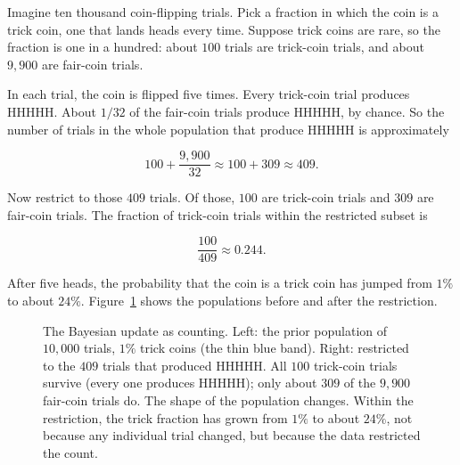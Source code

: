 Imagine ten thousand coin-flipping trials. Pick a fraction in which the coin is a trick coin, one that lands heads every time. Suppose trick coins are rare, so the fraction is one in a hundred: about $100$ trials are trick-coin trials, and about $9{,}900$ are fair-coin trials.

In each trial, the coin is flipped five times. Every trick-coin trial produces HHHHH. About $1/32$ of the fair-coin trials produce HHHHH, by chance. So the number of trials in the whole population that produce HHHHH is approximately

$$100 + \frac{9{,}900}{32} \approx 100 + 309 \approx 409.$$

Now restrict to those $409$ trials. Of those, $100$ are trick-coin trials and $309$ are fair-coin trials. The fraction of trick-coin trials within the restricted subset is

$$\frac{100}{409} \approx 0.244.$$

After five heads, the probability that the coin is a trick coin has jumped from $1\%$ to about $24\%$. Figure~\ref{fig:coin-counting} shows the populations before and after the restriction.

\begin{figure}[h]
\centering
{}
\caption{The Bayesian update as counting. Left: the prior population of $10{,}000$ trials, $1\%$ trick coins (the thin blue band). Right: restricted to the $409$ trials that produced HHHHH. All $100$ trick-coin trials survive (every one produces HHHHH); only about $309$ of the $9{,}900$ fair-coin trials do. The shape of the population changes. Within the restriction, the trick fraction has grown from $1\%$ to about $24\%$, not because any individual trial changed, but because the data restricted the count.}
\label{fig:coin-counting}
\end{figure}

